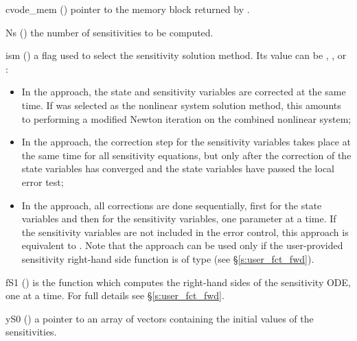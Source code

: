 {
  \begin{args}

  \item[cvode\_mem] ()
    pointer to the {\cvodes} memory block returned by .

  \item[Ns] () 
    the number of sensitivities to be computed.

  \item[ism] ()
    a flag used to select the sensitivity solution method. Its value can 
    be , , or :
    \begin{itemize}
    \item In the  approach, the state and sensitivity variables are
      corrected at the same time. If  was selected as the nonlinear system 
      solution method, this amounts to performing a modified Newton iteration on the
      combined nonlinear system;
    \item In the  approach, the correction step for the sensitivity
      variables takes place at the same time for all sensitivity equations, but only after 
      the correction of the state variables has converged and the state variables 
      have passed the local error test; 
    \item In the  approach, all corrections are done sequentially, first
      for the state variables and then for the sensitivity variables, one parameter at
      a time. If the sensitivity variables are not included in the error control, this 
      approach is equivalent to . Note that the  approach 
      can be used only if the user-provided sensitivity right-hand side function is of type
       (see \S\ref{s:user_fct_fwd}).
    \end{itemize}

  \item[fS1] ()
    is the {\CC} function which computes the right-hand sides of the sensitivity ODE, one
    at a time. For full details see \S\ref{s:user_fct_fwd}.

  \item[yS0] () 
    a pointer to an array of  vectors containing the initial 
    values of the sensitivities.

  \end{args}
}
